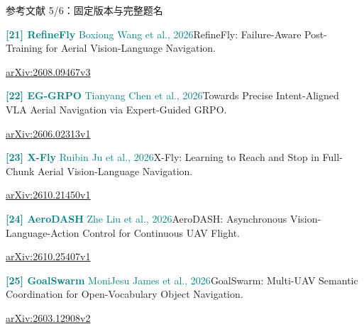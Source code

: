 \documentclass[aspectratio=169,10pt]{beamer}
\def\slidesource{}
\begin{document}
\begin{frame}[t,label=refs5]{参考文献 5/6：固定版本与完整题名}
\relax
{\fontsize{8.3}{10.6}\selectfont
\par\textcolor{teal}{\textbf{[21] RefineFly} Boxiong Wang et al., 2026}\quad RefineFly: Failure-Aware Post-Training for Aerial Vision-Language Navigation.\par\href{https://arxiv.org/html/2608.09467v3}{arXiv:2608.09467v3}\par\vspace{1.8mm}
\par\textcolor{teal}{\textbf{[22] EG-GRPO} Tianyang Chen et al., 2026}\quad Towards Precise Intent-Aligned VLA Aerial Navigation via Expert-Guided GRPO.\par\href{https://arxiv.org/html/2606.02313v1}{arXiv:2606.02313v1}\par\vspace{1.8mm}
\par\textcolor{teal}{\textbf{[23] X-Fly} Ruibin Ju et al., 2026}\quad X-Fly: Learning to Reach and Stop in Full-Chunk Aerial Vision-Language Navigation.\par\href{https://arxiv.org/html/2610.21450v1}{arXiv:2610.21450v1}\par\vspace{1.8mm}
\par\textcolor{teal}{\textbf{[24] AeroDASH} Zhe Liu et al., 2026}\quad AeroDASH: Asynchronous Vision-Language-Action Control for Continuous UAV Flight.\par\href{https://arxiv.org/html/2610.25407v1}{arXiv:2610.25407v1}\par\vspace{1.8mm}
\par\textcolor{teal}{\textbf{[25] GoalSwarm} MoniJesu James et al., 2026}\quad GoalSwarm: Multi-UAV Semantic Coordination for Open-Vocabulary Object Navigation.\par\href{https://arxiv.org/html/2603.12908v2}{arXiv:2603.12908v2}\par\vspace{1.8mm}
}
\end{frame}
\gdef\slidesource{\href{https://arxiv.org/html/2603.20804v2}{[26] Co-VLN}；\href{https://arxiv.org/html/2606.25119v1}{[27] SurveilNav}；\href{https://arxiv.org/html/2609.03483v3}{[28] AGC-VLN}；\href{https://arxiv.org/html/2607.18060v3}{[29] RoboHarness（策略编排）}；\href{https://arxiv.org/html/2610.14018v2}{[30] RoboHarness（几何工具）}}
\end{document}
